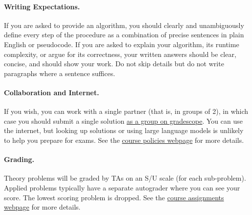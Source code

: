 \documentclass[11pt]{article}
\begin{document}
\paragraph{Writing Expectations.} If you are asked to provide an algorithm, you should clearly and unambiguously define every step of the procedure as a combination of precise sentences in plain English or pseudocode. If you are asked to explain your algorithm, its runtime complexity, or argue for its correctness, your written answers should be clear, concise, and should show your work. Do not skip details but do not write paragraphs where a sentence suffices.

\paragraph{Collaboration and Internet.} If you wish, you can work with a single partner (that is, in groups of 2), in which case you should submit a single solution \href{https://help.gradescope.com/article/m5qz2xsnjy-student-add-group-members}{as a group on gradescope}. You can use the internet, but looking up solutions or using large language models is unlikely to help you prepare for exams. See the \href{https://sites.duke.edu/spring24compsci330/policies/}{course policies webpage} for more details.

\paragraph{Grading.} Theory problems will be graded by TAs on an S/U scale (for each sub-problem). Applied problems typically have a separate autograder where you can see your score. The lowest scoring problem is dropped. See the \href{https://sites.duke.edu/spring24compsci330/assignments/}{course assignments webpage} for more details.





\newpage
\end{document}
